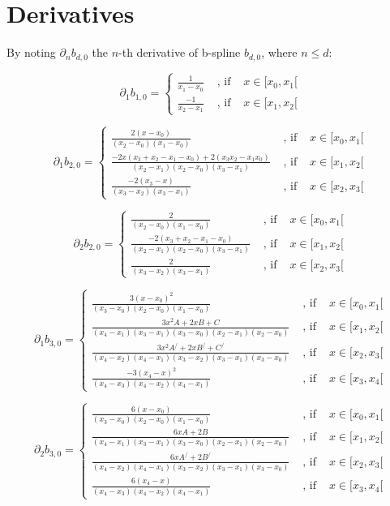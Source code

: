 \documentclass[paper=a4, fontsize=11pt]{scrartcl}
\numberwithin{equation}{section}		%
\numberwithin{figure}{section}			%
\numberwithin{table}{section}				%
\begin{document}
\newpage
\section{Derivatives}

By noting $\partial_n b_{d,0}$ the $n$-th derivative of b-spline $b_{d,0}$, where $n\leq d$:

$$
\partial_1 b_{1,0} =
\left\{
\begin{array}{lll}
\frac{1}{x_1-x_0} & \text{ ,  if  } & x \in [x_0,x_1[\\
\frac{-1}{x_2-x_1} & \text{ ,  if  } & x \in [x_1,x_2[
\end{array}
\right.
$$

$$
\partial_1 b_{2,0} =
\left\{
\begin{array}{lll}
\frac{2(x-x_0)}{(x_2-x_0)(x_1-x_0)} & \text{ ,  if  } & x \in [x_0,x_1[\\
\frac{-2x(x_3+x_2-x_1-x_0) + 2(x_3x_2-x_1x_0)}{ (x_2-x_1)(x_2-x_0)(x_3-x_1)} & \text{ ,  if  } & x \in [x_1,x_2[\\
\frac{-2(x_3-x)}{(x_3-x_2)(x_3-x_1)} & \text{ ,  if  } & x \in [x_2,x_3[
\end{array}
\right.
$$

$$
\partial_2 b_{2,0} =
\left\{
\begin{array}{lll}
\frac{2}{(x_2-x_0)(x_1-x_0)} & \text{ ,  if  } & x \in [x_0,x_1[\\
\frac{-2(x_3+x_2-x_1-x_0)}{ (x_2-x_1)(x_2-x_0)(x_3-x_1)} & \text{ ,  if  } & x \in [x_1,x_2[\\
\frac{2}{(x_3-x_2)(x_3-x_1)} & \text{ ,  if  } & x \in [x_2,x_3[
\end{array}
\right.
$$


$$
\partial_1 b_{3,0} =
\left\{
\begin{array}{lll}
\frac{3(x-x_0)^2}{(x_3-x_0)(x_2-x_0)(x_1-x_0)} & \text{ ,  if  } & x \in [x_0,x_1[\\
\frac{3x^2A + 2xB + C}{(x_4-x_1)(x_3-x_1)(x_3-x_0)(x_2-x_1)(x_2-x_0)} & \text{ ,  if  } & x \in [x_1,x_2[\\
\frac{3x^2A^/ + 2xB^/ + C^/}{(x_4-x_2)(x_4-x_1)(x_3-x_2)(x_3-x_1)(x_3-x_0)} & \text{ ,  if  } & x \in [x_2,x_3[\\
\frac{-3(x_4-x)^2}{(x_4-x_3)(x_4-x_2)(x_4-x_1)} & \text{ ,  if  } & x \in [x_3,x_4[
\end{array}
\right.
$$

$$
\partial_2 b_{3,0} =
\left\{
\begin{array}{lll}
\frac{6(x-x_0)}{(x_3-x_0)(x_2-x_0)(x_1-x_0)} & \text{ ,  if  } & x \in [x_0,x_1[\\
\frac{6xA + 2B}{(x_4-x_1)(x_3-x_1)(x_3-x_0)(x_2-x_1)(x_2-x_0)} & \text{ ,  if  } & x \in [x_1,x_2[\\
\frac{6xA^/ + 2B^/}{(x_4-x_2)(x_4-x_1)(x_3-x_2)(x_3-x_1)(x_3-x_0)} & \text{ ,  if  } & x \in [x_2,x_3[\\
\frac{6(x_4-x)}{(x_4-x_3)(x_4-x_2)(x_4-x_1)} & \text{ ,  if  } & x \in [x_3,x_4[
\end{array}
\right.
$$
\end{document}
